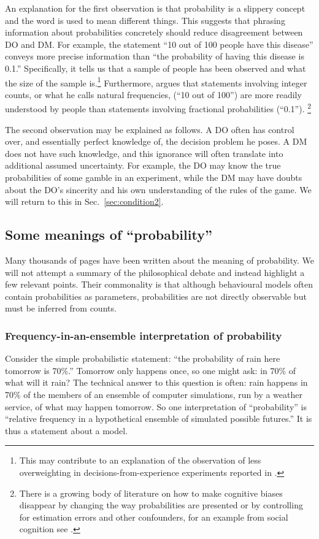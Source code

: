 \documentclass[a4paper, 12pt]{article}
\newcommand{\seclabel}[1]{\label{sec:#1}}
\newcommand{\secref}[1]{Sec.~\ref{sec:#1}}
\begin{document}
An explanation for the first observation is that probability is a slippery concept and the word is used to mean different things. This suggests that phrasing information about probabilities concretely should reduce disagreement between DO and DM. For example, the statement ``10 out of 100 people have this disease'' conveys more precise information than ``the probability of having this disease is 0.1.'' Specifically, it tells us that a sample of people has been observed and what the size of the sample is.\footnote{This may contribute to an explanation of the observation of less overweighting in decisions-from-experience experiments reported in \textcite{HertwigETAL2004,HertwigErev2009}.} Furthermore, \textcite{Gigerenzer2018} argues that statements involving integer counts, or what he calls natural frequencies,  (``10 out of 100'') are more readily understood by people than statements involving fractional probabilities (``0.1'').%
\footnote{There is a growing body of literature on how to make cognitive biases disappear by changing the way probabilities are presented \parencite{Gigerenzer1991} or by controlling for estimation errors and other confounders, for an example from social cognition see \textcite{GalesicETAL2012}.}

The second observation may be explained as follows. A DO often has control over, and essentially perfect knowledge of, the decision problem he poses. A DM does not have such knowledge, and this ignorance will often translate into additional assumed uncertainty. For example, the DO may know the true probabilities of some gamble in an experiment, while the DM may have doubts about the DO's sincerity and his own understanding of the rules of the game. We will return to this in \secref{condition2}.

\subsection{Some meanings of ``probability'' \seclabel{tricky}}
Many thousands of pages have been written about the meaning of probability. We will not attempt a summary of the philosophical debate and instead highlight a few relevant points. Their commonality is that although behavioural models often contain probabilities as parameters, probabilities are not directly observable but must be inferred from counts.

\subsubsection*{Frequency-in-an-ensemble interpretation of probability}
Consider the simple probabilistic statement: ``the probability of rain here tomorrow is 70\%.'' Tomorrow only happens once, so one might ask: in 70\% of what will it rain? The technical answer to this question is often: rain happens in 70\% of the members of an ensemble of computer simulations, run by a weather service, of what may happen tomorrow. So one interpretation of ``probability'' is ``relative frequency in a hypothetical ensemble of simulated possible futures.'' It is thus a statement about a model.
\end{document}
